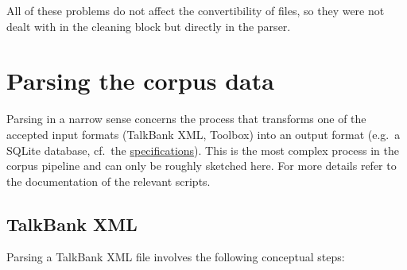 \documentclass[a4paper, 11pt]{book}
\begin{document}
All of these problems do not affect the convertibility of files, so they were not dealt with in the cleaning block but directly in the parser. 


\section{Parsing the corpus data}
\label{sec:Parsing the corpus data}

Parsing in a narrow sense concerns the process that transforms one of the accepted input formats (TalkBank XML, Toolbox) into an output format (e.g.\ a SQLite database, cf.\ the \hyperref[sec:Structure of the corpus]{specifications}). This is the most complex process in the corpus pipeline and can only be roughly sketched here. For more details refer to the documentation of the relevant scripts. 

\subsection{TalkBank XML}

Parsing a TalkBank XML file involves the following conceptual steps: 
\end{document}
